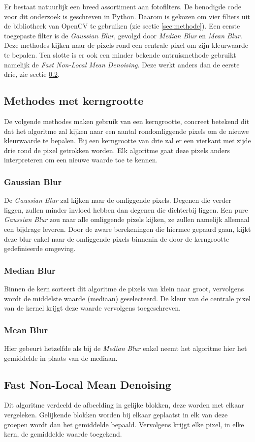 Er bestaat natuurlijk een breed assortiment aan fotofilters. De benodigde code voor dit onderzoek is geschreven in Python. Daarom is gekozen om vier filters uit de bibliotheek van OpenCV te gebruiken (zie sectie \ref{sec:methode}).  Een eerste toegepaste filter is de \textit{Gaussian Blur}, gevolgd door \textit{Median Blur} en \textit{Mean Blur}. Deze methodes kijken naar de pixels rond een centrale pixel om zijn kleurwaarde te bepalen. Ten slotte is er ook een minder bekende ontruismethode gebruikt namelijk de \textit{Fast Non-Local Mean Denoising}. Deze werkt anders dan de eerste drie, zie sectie \ref{subsec:fnlmd}.

\subsection{Methodes met kerngrootte}
De volgende methodes maken gebruik van een kerngrootte, concreet betekend dit dat het algoritme zal kijken naar een aantal rondomliggende pixels om de nieuwe kleurwaarde te bepalen. Bij een kerngrootte van drie zal er een vierkant met zijde drie rond de pixel getrokken worden. Elk algoritme gaat deze pixels anders interpreteren om een nieuwe waarde toe te kennen.
\subsubsection{Gaussian Blur}
De {\it Gaussian Blur} zal kijken naar de omliggende pixels. Degenen die verder liggen, zullen minder invloed hebben dan degenen die dichterbij liggen. Een pure {\it Gaussian Blur} zou naar alle omliggende pixels kijken, ze zullen namelijk allemaal een bijdrage leveren. Door de zware berekeningen die hiermee gepaard gaan, kijkt deze blur enkel naar de omliggende pixels binnenin de door de kerngrootte gedefinieerde omgeving. \cite{gaussianBlur}

\subsubsection{Median Blur}
Binnen de kern sorteert dit algoritme de pixels van klein naar groot, vervolgens wordt de middelste waarde (mediaan) geselecteerd. De kleur van de centrale pixel van de kernel krijgt deze waarde vervolgens toegeschreven.

\subsubsection{Mean Blur}
Hier gebeurt hetzelfde als bij de {\it Median Blur} enkel neemt het algoritme hier het gemiddelde in plaats van de mediaan.

\subsection{Fast Non-Local Mean Denoising}
\label{subsec:fnlmd}
Dit algoritme verdeeld de afbeelding in gelijke blokken, deze worden met elkaar vergeleken. Gelijkende blokken worden bij elkaar geplaatst in elk van deze groepen wordt dan het gemiddelde bepaald. Vervolgens krijgt elke pixel, in elke kern, de gemiddelde waarde toegekend. \cite{fastExplanation}